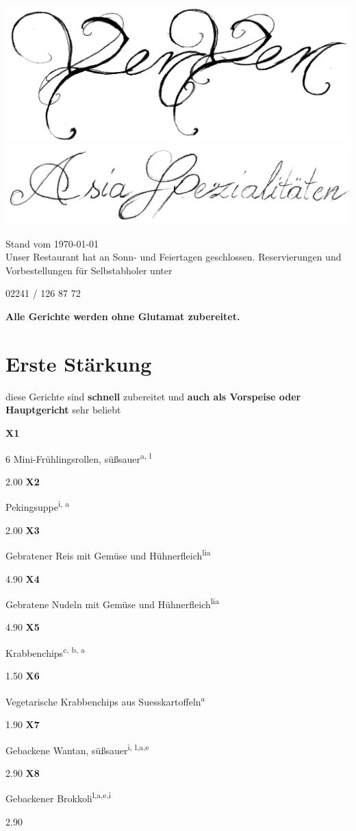 \documentclass[a4paper,10pt,notumble]{leaflet}
\newcommand{\meal}[4]{\textbf{#1}\hspace{3mm}%
\begin{minipage}[t]{5.5 cm}
\begin{flushleft}
#2\textsuperscript{#3}
\end{flushleft}
\end{minipage}%
\hfill\SI{#4}{\EUR}\newline}
\newcommand{\Getreideprodukte}{a}
\newcommand{\Fisch}{b}
\newcommand{\Krebstiere}{c}
\newcommand{\Sellerie}{e}
\newcommand{\Eier}{i}
\newcommand{\Soja}{l}
\begin{document}
 

\begin{center}
\includegraphics[width=\textwidth]{gfx/yenyen_head}
\includegraphics[width=\textwidth]{gfx/Asia_Spezialitaeten}
\end{center}

{\small Stand vom \today}\\[5mm]
Unser Restaurant hat an Sonn- und Feiertagen geschlossen. Reservierungen und Vorbestellungen für Selbstabholer unter
\begin{center}
{\Huge 02241 / 126 87 72}
\end{center}

\textbf{Alle Gerichte werden ohne Glutamat zubereitet.}

\section*{Erste Stärkung}
diese Gerichte sind \textbf{schnell} zubereitet und 
\textbf{auch als Vorspeise oder Hauptgericht} sehr beliebt
\begin{flushleft}
\meal{X1}{6 Mini-Frühlingsrollen, süßsauer}{\Getreideprodukte, \Soja}{2.00}
\meal{X2}{Pekingsuppe}{\Eier, \Getreideprodukte}{2.00}
\meal{X3}{Gebratener Reis mit Gemüse und Hühnerfleich}{\Soja \Eier \Getreideprodukte}{4.90}
\meal{X4}{Gebratene Nudeln mit Gemüse und Hühnerfleich}{\Soja \Eier \Getreideprodukte}{4.90}
\meal{X5}{Krabbenchips}{\Krebstiere, \Fisch, \Getreideprodukte}{1.50}
\meal{X6}{Vegetarische Krabbenchips aus Suesskartoffeln}{\Getreideprodukte}{1.90}
\meal{X7}{Gebackene Wantan, süßsauer}{\Eier, \Soja,\Getreideprodukte,\Sellerie}{2.90}
\meal{X8}{Gebackener Brokkoli}{\Soja,\Getreideprodukte,\Sellerie,\Eier}{2.90}
\end{flushleft}
\end{document}
